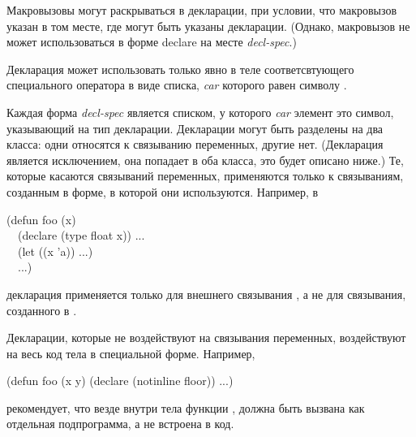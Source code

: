 \begin{defspec}
Макровызовы могут раскрываться в декларации, при условии, что макровызов указан
в том месте, где могут быть указаны декларации.
(Однако, макровызов не может использоваться в форме declare на месте
\emph{decl-spec}.)

Декларация может использовать только явно в теле соответсвтующего специального
оператора в виде списка, \emph{car} которого равен символу .

Каждая форма \emph{decl-spec} является списком, у которого \emph{car} элемент
это символ, указывающий на тип декларации. Декларации могут быть разделены на
два класса: одни относятся к связыванию переменных, другие нет.
(Декларация  является исключением, она попадает в оба класса, это
будет описано ниже.) 
Те, которые касаются связываний переменных, применяются только к связываниям,
созданным в форме, в которой они используются. Например, в 
\begin{lisp}
(defun foo (x) \\
~~(declare (type float x)) ... \\
~~(let ((x 'a)) ...) \\
~~...)
\end{lisp}
декларация  применяется только для внешнего связывания , а не
для связывания, созданного в .

Декларации, которые не воздействуют на связывания переменных, воздействуют на
весь код тела в специальной форме.
Например,
\begin{lisp}
(defun foo (x y) (declare (notinline floor)) ...)
\end{lisp}
рекомендует, что везде внутри тела функции ,  должна быть
вызвана как отдельная подпрограмма, а не встроена в код.


\end{defspec}
